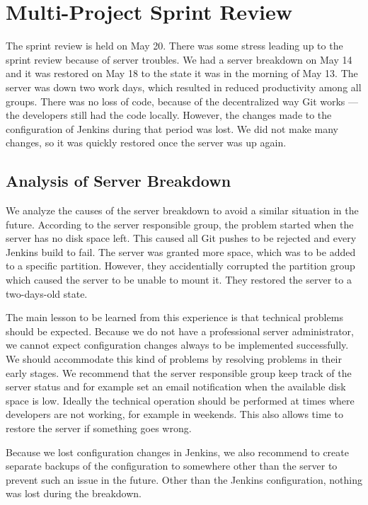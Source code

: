 \section{Multi-Project Sprint Review}\label{sec:s4_multiprj_review}
The sprint review is held on May 20. There was some stress leading up to the sprint review because of server troubles. We had a server breakdown on May 14 and it was restored on May 18 to the state it was in the morning of May 13. The server was down two work days, which resulted in reduced productivity among all groups. There was no loss of code, because of the decentralized way Git works --- the developers still had the code locally.  However, the changes made to the configuration of Jenkins during that period was lost. We did not make many changes, so it was quickly restored once the server was up again.

\subsection{Analysis of Server Breakdown}
We analyze the causes of the server breakdown to avoid a similar situation in the future. According to the server responsible group, the problem started when the server has no disk space left. This caused all Git pushes to be rejected and every Jenkins build to fail. The server was granted more space, which was to be added to a specific partition. However, they accidentially corrupted the partition group which caused the server to be unable to mount it. They restored the server to a two-days-old state.

The main lesson to be learned from this experience is that technical problems should be expected. Because we do not have a professional server administrator, we cannot expect configuration changes always to be implemented successfully. We should accommodate this kind of problems by resolving problems in their early stages. We recommend that the server responsible group keep track of the server status and for example set an email notification when the available disk space is low. Ideally the technical operation should be performed at times where developers are not working, for example in weekends. This also allows time to restore the server if something goes wrong.

Because we lost configuration changes in Jenkins, we also recommend to create separate backups of the configuration to somewhere other than the server to prevent such an issue in the future. Other than the Jenkins configuration, nothing was lost during the breakdown.
